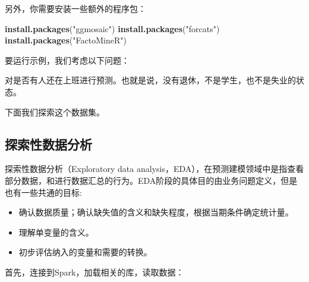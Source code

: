\documentclass[
]{article}
\newenvironment{Shaded}{\begin{snugshade}}{\end{snugshade}}
\newcommand{\KeywordTok}[1]{\textcolor[rgb]{0.13,0.29,0.53}{\textbf{#1}}}
\newcommand{\NormalTok}[1]{#1}
\newcommand{\StringTok}[1]{\textcolor[rgb]{0.31,0.60,0.02}{#1}}
\providecommand{\tightlist}{%
  \setlength{\itemsep}{0pt}\setlength{\parskip}{0pt}}
\begin{document}
另外，你需要安装一些额外的程序包：

\begin{Shaded}
\begin{Highlighting}[]
\KeywordTok{install.packages}\NormalTok{(}\StringTok{"ggmosaic"}\NormalTok{)}
\KeywordTok{install.packages}\NormalTok{(}\StringTok{"forcats"}\NormalTok{)}
\KeywordTok{install.packages}\NormalTok{(}\StringTok{"FactoMineR"}\NormalTok{)}
\end{Highlighting}
\end{Shaded}

要运行示例，我们考虑以下问题：

对是否有人还在上班进行预测。也就是说，没有退休，不是学生，也不是失业的状态。

下面我们探索这个数据集。

\hypertarget{ux63a2ux7d22ux6027ux6570ux636eux5206ux6790}{%
\subsection{探索性数据分析}\label{ux63a2ux7d22ux6027ux6570ux636eux5206ux6790}}

探索性数据分析（Exploratory data
analysis，EDA），在预测建模领域中是指查看部分数据，和进行数据汇总的行为。EDA阶段的具体目的由业务问题定义，但是也有一些共通的目标:

\begin{itemize}
\tightlist
\item
  确认数据质量；确认缺失值的含义和缺失程度，根据当期条件确定统计量。
\item
  理解单变量的含义。
\item
  初步评估纳入的变量和需要的转换。
\end{itemize}

首先，连接到Spark，加载相关的库，读取数据：
\end{document}
